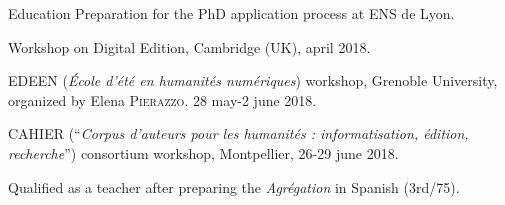 \begin{rubric}{Education}
                                \entry*[2017-2018]
                            Preparation for the PhD application process at ENS de Lyon.
                    
                                \entry*
                            Workshop on Digital Edition, Cambridge (UK), april 2018.
                    
                                 EDEEN (\textit{École d'été en humanités numériques}) workshop,
                        Grenoble University, organized by Elena \textsc{Pierazzo}. 28
                        may-2 june 2018.
                    
                                 CAHIER (\enquote{\textit{Corpus d’auteurs pour les humanités :
                        informatisation, édition, recherche}}) consortium workshop,
                        Montpellier, 26-29 june 2018.
                    
                                \entry*[2016-2017]
                            Qualified as a teacher after preparing the \textit{Agrégation} in
                        Spanish (3rd/75).
                    

\end{rubric}
